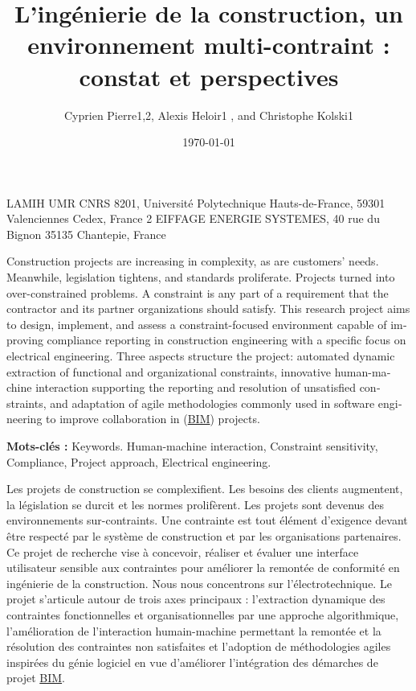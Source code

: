 \documentclass[a4paper,12pt]{article}
\author{Cyprien Pierre1,2, Alexis Heloir1 , and Christophe Kolski1}
\date{\today}
\title{L’ingénierie de la construction, un environnement multi-contraint : constat et perspectives}
\newenvironment{keyword}{\begin{trivlist}\item[]{\bfseries Mots-clés :}}{\end{trivlist}}
\begin{document}
 LAMIH UMR CNRS 8201, Université Polytechnique Hauts-de-France, 59301 Valenciennes Cedex, France
2 EIFFAGE ENERGIE SYSTEMES, 40 rue du Bignon 35135 Chantepie, France
\begin{otherlanguage}{english}
\begin{ABSTRACT}
Construction projects are increasing in complexity, as are customers’ needs. Meanwhile, legislation tightens, and standards proliferate. Projects turned into over-constrained problems. A constraint is any part of a requirement that the contractor and its partner organizations should satisfy. This research project aims to design, implement, and assess a constraint-focused environment capable of improving compliance reporting in construction engineering with a specific focus on electrical engineering. Three aspects structure the project: automated dynamic extraction of functional and organizational constraints, innovative human-machine interaction supporting the reporting and resolution of unsatisfied constraints, and adaptation of agile methodologies commonly used in software engineering to improve collaboration in  (\protect\hyperlink{gls-1}{\label{gls-1-use-1}BIM}) projects.
\end{ABSTRACT}

\begin{keyword}
Keywords. Human-machine interaction, Constraint sensitivity, Compliance, Project approach, Electrical engineering.
\end{keyword}
\end{otherlanguage}

\begin{ABSTRACT}
Les projets de construction se complexifient. Les besoins des clients augmentent, la législation se durcit et les normes prolifèrent. Les projets sont devenus des environnements sur-contraints. Une contrainte est tout élément d’exigence devant être respecté par le système de construction et par les organisations partenaires. Ce projet de recherche vise à concevoir, réaliser et évaluer une interface utilisateur sensible aux contraintes pour améliorer la remontée de conformité en ingénierie de la construction. Nous nous concentrons sur l’électrotechnique. Le projet s'articule autour de trois axes principaux : l'extraction dynamique des contraintes fonctionnelles et organisationnelles par une approche algorithmique, l'amélioration de l'interaction humain-machine permettant la remontée et la résolution des contraintes non satisfaites et l'adoption de méthodologies agiles inspirées du génie logiciel en vue d’améliorer l’intégration des démarches de projet \protect\hyperlink{gls-1}{\label{gls-1-use-2}BIM}. 
\end{ABSTRACT}
\end{document}
